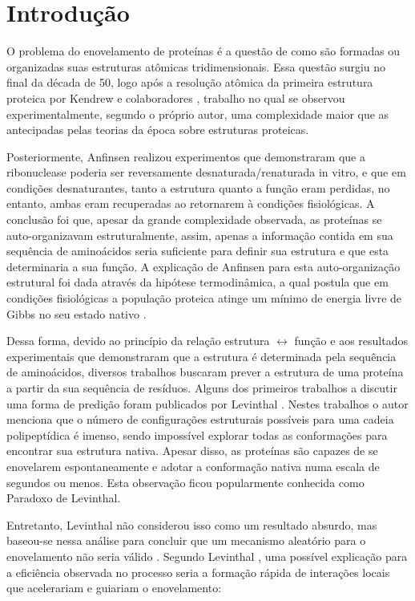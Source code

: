 \chapter{Introdução}\label{ch:introducao}

O problema do enovelamento de proteínas é a questão de como são formadas ou organizadas suas estruturas atômicas tridimensionais. Essa questão surgiu no final da década de 50, logo após a resolução atômica da primeira estrutura proteica por Kendrew e colaboradores \cite{KENDREW1958}, trabalho no qual se observou experimentalmente, segundo o próprio autor, uma complexidade maior que as antecipadas pelas teorias da época sobre estruturas proteicas. 

Posteriormente, Anfinsen \cite{Anfinsen1973} realizou experimentos que demonstraram que a ribonuclease poderia ser reversamente desnaturada/renaturada in vitro, e que em condições desnaturantes, tanto a estrutura quanto a função eram perdidas, no entanto, ambas eram recuperadas ao retornarem à condições fisiológicas. A conclusão foi que, apesar da grande complexidade observada, as proteínas se auto-organizavam estruturalmente, assim, apenas a informação contida em sua sequência de aminoácidos seria suficiente para definir sua estrutura e que esta determinaria a sua função. A explicação de Anfinsen para esta auto-organização estrutural foi dada através da hipótese termodinâmica, a qual postula que em condições fisiológicas a população proteica atinge um mínimo de energia livre de Gibbs no seu estado nativo \cite{Rose2006}.

Dessa forma, devido ao princípio da relação estrutura $\leftrightarrow$ função e aos resultados experimentais que demonstraram que a estrutura é determinada pela sequência de aminoácidos, diversos trabalhos buscaram prever a estrutura de uma proteína a partir da sua sequência de resíduos. Alguns dos primeiros trabalhos a discutir uma forma de predição foram publicados por Levinthal \cite{Levinthal1968, Levinthal1969}. Nestes trabalhos o autor menciona que o número de configurações estruturais possíveis para uma cadeia polipeptídica é imenso, sendo impossível explorar todas as conformações para encontrar sua estrutura nativa. Apesar disso, as proteínas são capazes de se enovelarem espontaneamente e adotar a conformação nativa numa escala de segundos ou menos. Esta observação ficou popularmente conhecida como Paradoxo de Levinthal. 

Entretanto, Levinthal não considerou isso como um resultado absurdo, mas baseou-se nessa análise para concluir que um mecanismo aleatório para o enovelamento não seria válido \cite{Ben-Naim2012}. Segundo Levinthal \cite{Levinthal1968}, uma possível explicação para a eficiência observada no processo seria a formação rápida de interações locais que acelerariam e guiariam o enovelamento:

